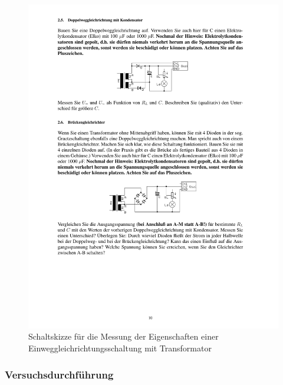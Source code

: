 \documentclass[12pt,a4paper]{article}
\begin{document}
\begin{figure}[H] 
  \centering
    \includegraphics[trim = 10mm 200mm 10mm 45mm, clip, scale = 1]{ep2_14[Page10].pdf}
  	\caption[Schaltskizze für die Messung der Eigenschaften einer Einweggleichrichtungsschaltung mit Transformator]{Schaltskizze für die Messung der Eigenschaften einer Einweggleichrichtungsschaltung mit Transformator\footnotemark}
  \label{fig:2_6}
\end{figure}

\subsubsection{Versuchsdurchführung}
\end{document}
